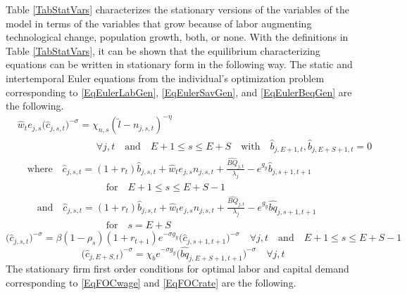 \documentclass[letterpaper,12pt]{article}
\theoremstyle{definition}
\begin{document}
\begin{spacing}{1.5}
    Table \ref{TabStatVars} characterizes the stationary versions of the variables of the model in terms of the variables that grow because of labor augmenting technological change, population growth, both, or none. With the definitions in Table \ref{TabStatVars}, it can be shown that the equilibrium characterizing equations can be written in stationary form in the following way. The static and intertemporal Euler equations from the individual's optimization problem corresponding to \eqref{EqEulerLabGen}, \eqref{EqEulerSavGen}, and \eqref{EqEulerBeqGen} are the following.
    \begin{equation}\label{EqEulerLabStat}
      \begin{split}
        &\hat{w}_t e_{j,s}\bigl(\hat{c}_{j,s,t}\bigr)^{-\sigma} = \chi_{n,s}(\tilde{l} - n_{j,s,t})^{-\eta} \\
        &\quad\quad\quad\quad\quad\quad\quad\quad\forall j,t \quad\text{and}\quad E+1\leq s\leq E+S \quad\text{with}\quad \hat{b}_{j,E+1,t},\hat{b}_{j,E+S+1,t}=0 \\
        &\quad\text{where}\quad \hat{c}_{j,s,t} = \left(1+r_t\right)\hat{b}_{j,s,t} + \hat{w}_t e_{j,s}n_{j,s,t} + \frac{\hat{BQ}_{j,t}}{\lambda_j} - e^{g_y}\hat{b}_{j,s+1,t+1} \\
        &\quad\quad\quad\quad\quad\quad\quad\quad\quad\text{for}\quad E+1\leq s\leq E+S-1 \\
        &\quad\quad\text{and}\quad \hat{c}_{j,s,t} = \left(1+r_t\right)\hat{b}_{j,s,t} + \hat{w}_t e_{j,s}n_{j,s,t} + \frac{\hat{BQ}_{j,t}}{\lambda_j} - e^{g_y}\hat{bq}_{j,s+1,t+1} \\
        &\quad\quad\quad\quad\quad\quad\quad\quad\quad\text{for}\quad s=E+S
      \end{split}
    \end{equation}
    \begin{equation}\label{EqEulerSavStat}
      \bigl(\hat{c}_{j,s,t}\bigr)^{-\sigma} = \beta(1-\rho_s)(1+r_{t+1})e^{-\sigma g_y}\bigl(\hat{c}_{j,s+1,t+1}\bigr)^{-\sigma}\quad\forall j,t \quad\text{and}\quad E+1\leq s\leq E+S-1
    \end{equation}
    \begin{equation}\label{EqEulerBeqStat}
      \bigl(\hat{c}_{j,E+S,t}\bigr)^{-\sigma} = \chi_b e^{-\sigma g_y}\bigl(\hat{bq}_{j,E+S+1,t+1}\bigr)^{-\sigma} \quad\forall j,t
    \end{equation}
    The stationary firm first order conditions for optimal labor and capital demand corresponding to \eqref{EqFOCwage} and \eqref{EqFOCrate} are the following.

\end{spacing}
\end{document}
